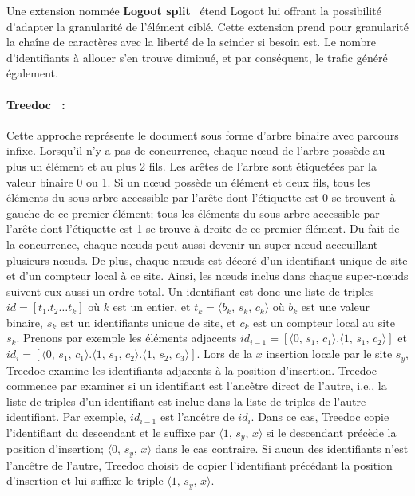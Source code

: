 \noindent Une extension nommée \textbf{Logoot split}~\cite{andre2013supporting}
étend Logoot lui offrant la possibilité d'adapter la granularité de l'élément
ciblé.  Cette extension prend pour granularité la chaîne de caractères avec la
liberté de la scinder si besoin est. Le nombre d'identifiants à allouer s'en
trouve diminué, et par conséquent, le trafic généré également.

\paragraph{Treedoc~\cite{letia2009crdts, preguica2009commutative} :} Cette
approche représente le document sous forme d'arbre binaire avec parcours infixe.
Lorsqu'il n'y a pas de concurrence, chaque nœud de l'arbre possède au plus un
élément et au plus 2 fils. Les arêtes de l'arbre sont étiquetées par la valeur
binaire 0 ou 1.  Si un nœud possède un élément et deux fils, tous les éléments
du sous-arbre accessible par l'arête dont l'étiquette est 0 se trouvent à gauche
de ce premier élément; tous les éléments du sous-arbre accessible par l'arête
dont l'étiquette est 1 se trouve à droite de ce premier élément. Du fait de la
concurrence, chaque nœuds peut aussi devenir un super-nœud acceuillant plusieurs
nœuds. De plus, chaque nœuds est décoré d'un identifiant unique de site et d'un
compteur local à ce site. Ainsi, les nœuds inclus dans chaque super-nœuds
suivent eux aussi un ordre total. Un identifiant est donc une liste de triples
$id = [t_1.t_2\ldots t_k]$ où $k$ est un entier, et
$t_k = \langle b_k,\, s_k,\, c_k\rangle$ où $b_k$ est une valeur binaire, $s_k$
est un identifiants unique de site, et $c_k$ est un compteur local au site
$s_k$.  Prenons par exemple les éléments adjacents
$id_{i-1}=[\langle 0,\,s_1,\,c_1 \rangle.\langle 1,\,s_1,\,c_2 \rangle]$ et
$id_i=[\langle 0,\,s_1,\,c_1 \rangle.\langle 1,\,s_1,\,c_2 \rangle. \langle 1,\,
s_2,\, c_3 \rangle]$.
Lors de la $x$ insertion locale par le site $s_y$, Treedoc examine les
identifiants adjacents à la position d'insertion. Treedoc commence par examiner
si un identifiant est l'ancêtre direct de l'autre, i.e., la liste de triples
d'un identifiant est inclue dans la liste de triples de l'autre identifiant. Par
exemple, $id_{i-1}$ est l'ancêtre de $id_i$. Dans ce cas, Treedoc copie
l'identifiant du descendant et le suffixe par $\langle 1,\, s_y,\, x \rangle$ si
le descendant précède la position d'insertion; $\langle 0,\, s_y,\, x \rangle$
dans le cas contraire. Si aucun des identifiants n'est l'ancêtre de l'autre,
Treedoc choisit de copier l'identifiant précédant la position d'insertion et lui
suffixe le triple $\langle 1,\, s_y,\, x \rangle$.

